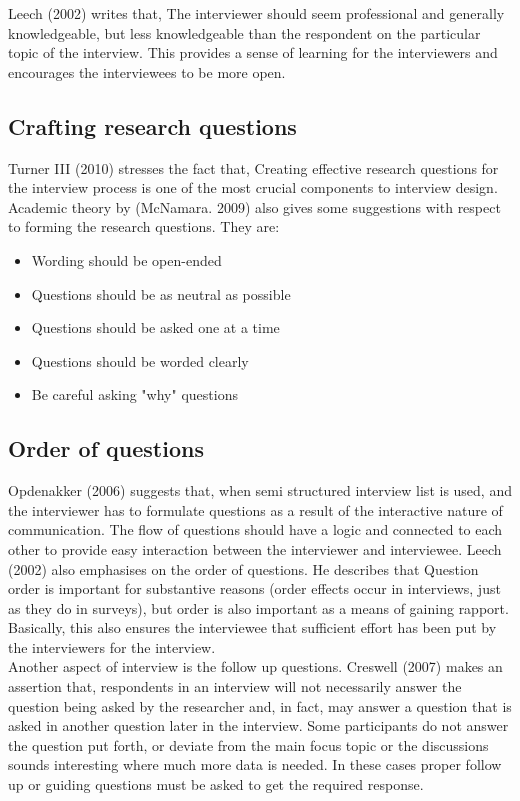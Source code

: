 Leech (2002) writes that, The interviewer should seem professional and generally knowledgeable, but less knowledgeable than the respondent on the particular topic of the interview. This provides a sense of learning for the interviewers and encourages the interviewees to be more open. \\

\subsection{Crafting research questions}
Turner III (2010) stresses the fact that, Creating effective research questions for the interview process is one of the most crucial components to interview design. Academic theory by (McNamara. 2009) also gives some suggestions with respect to forming the research questions. They are:\\

\begin{itemize}
    \item Wording should be open-ended
    \item Questions should be as neutral as possible
    \item Questions should be asked one at a time
    \item Questions should be worded clearly
    \item Be careful asking "why" questions\\
\end{itemize}


\subsection{Order of questions}
Opdenakker (2006) suggests that, when semi structured interview list is used, and the interviewer has to formulate questions as a result of the interactive nature of communication. The flow of questions should have a logic and connected to each other to provide easy interaction between the interviewer and interviewee. Leech (2002) also emphasises on the order of questions. He describes that Question order is important for substantive reasons (order effects occur in interviews, just as they do in surveys), but order is also important as a means of gaining rapport. Basically, this also ensures the interviewee that sufficient effort has been put by the interviewers for the interview.\\

Another aspect of interview is the follow up questions. Creswell (2007) makes an assertion that, respondents in an interview will not necessarily answer the question being asked by the researcher and, in fact, may answer a question that is asked in another question later in the interview. Some participants do not answer the question put forth, or deviate from the main focus topic or the discussions sounds interesting where much more data is needed. In these cases proper follow up or guiding questions must be asked to get the required response.\\

